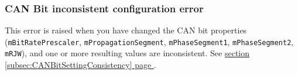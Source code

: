 \documentclass[10pt, a4paper, obeyspaces, openany]{extarticle}
\newcommand\refSubsectionPage[1]{\hyperref[subsec:#1]{section \ref*{subsec:#1} page \pageref{subsec:#1}}}
\newcommand \subsubsectionLabel[2]{\subsubsection{#1}\label{subsubsec:#2}}
\begin{document}
\subsubsectionLabel{CAN Bit inconsistent configuration error}{CANBitInconsistentConfigError}

This error is raised when you have changed the CAN bit properties (\texttt{mBitRatePrescaler}, \texttt{mPropagationSegment}, \texttt{mPhaseSegment1}, \texttt{mPhaseSegment2}, \texttt{mRJW}), and one or more resulting values are inconsistent. See \refSubsectionPage{CANBitSettingConsistency}.

%
%
%
%
%
\end{document}
